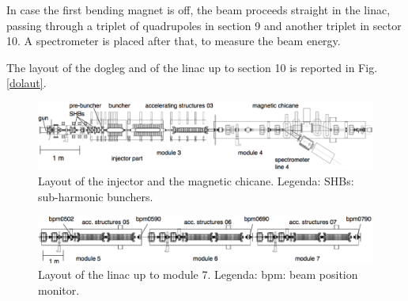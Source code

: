 In case the first bending magnet is off, the beam proceeds straight in the linac, passing through a triplet of quadrupoles in section 9 and another triplet in sector 10. A spectrometer is placed after that, to measure the beam energy. 

The layout of the dogleg and of the linac up to section 10 is reported in Fig. \ref{dolaut}.


\begin{landscape}
\begin{center}

\begin{figure}
\centering 
\includegraphics[width=23cm,keepaspectratio]{pictures/Injector}
\caption{Layout of the injector and the magnetic chicane. Legenda: SHBs: sub-harmonic bunchers.\vspace{4mm}}
\label{injlayout}
\end{figure}



\begin{figure}
\centering 
\includegraphics[width=23cm,keepaspectratio]{pictures/girder5-7}
\caption{Layout of the linac up to module 7. Legenda: bpm: beam position monitor.}
\label{linaclayout}
\end{figure}

\end{center}
\end{landscape}



